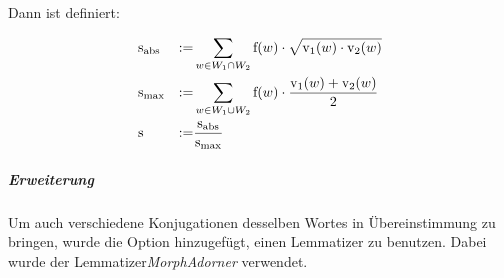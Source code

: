 Dann ist definiert:

\begin{subequations}
\begin{align}
\textnormal{s}&_{\textnormal{abs}} 	&:=& \sum_{w\in W_1\cap W_2} \textnormal{f}(w)\cdot\sqrt{\textnormal{v}_1(w)\cdot	\textnormal{v}_2(w)}\\
\textnormal{s}&_{\max}		&:=& \sum_{w\in W_1\cup W_2} \textnormal{f}(w)\cdot\frac{\textnormal{v}_1(w)+	\textnormal{v}_2(w)}{2}\\
\textnormal{s}	&		&:=& \frac{\textnormal{s}_{\textnormal{abs}}}{\textnormal{s}_{\max}}
\end{align}
\label{tab:aehnlichkeitsmass-abstracts}
\end{subequations}

\subparagraph{Erweiterung}
Um auch verschiedene Konjugationen desselben Wortes in Übereinstimmung zu bringen, wurde die Option hinzugefügt, einen Lemmatizer zu benutzen.
Dabei wurde der Lemmatizer\emph{MorphAdorner}\footnotemark{} verwendet.

